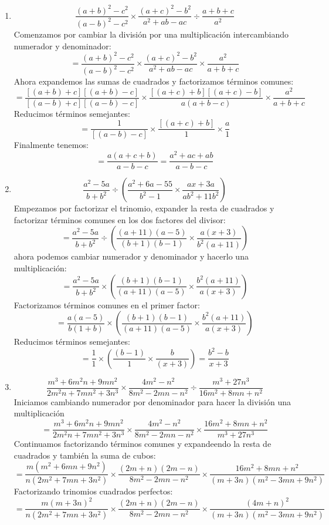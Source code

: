 \documentclass[12pt]{article}
\begin{document}
\begin{enumerate}[label=\bfseries Ejercicio \arabic*:]
  \item $$\frac{(a + b)^2 - c^2}{(a - b)^2 - c^2} \times \frac{(a + c)^2 -b^2}{a^2 + ab -ac} \div \frac{a + b+ c}{a^2}$$
Comenzamos por cambiar la división por una multiplicación intercambiando numerador y denominador:
$$= \frac{(a + b)^2 - c^2}{(a - b)^2 - c^2} \times \frac{(a + c)^2 -b^2}{a^2 + ab -ac} \times \frac{a^2}{a + b+ c}$$
Ahora expandemos las sumas de cuadrados y factorizamos términos comunes:
$$= \frac{[(a+ b) + c][(a+ b) - c]}{[(a - b) + c][(a - b) - c]} \times \frac{[(a + c) + b][(a + c) - b]}{a(a + b - c)} \times \frac{a^2}{a + b+ c}$$
Reducimos términos semejantes:
$$= \frac{1}{[(a - b) - c]} \times \frac{[(a + c) + b]}{1} \times \frac{a}{1}$$
Finalmente tenemos:
$$= \frac{a(a + c + b)}{a - b - c} = \frac{a^2 + ac + ab}{a - b - c}$$
  \item  $$\frac{a^2 - 5a}{b + b^2} \div \left( \frac{a^2 + 6a - 55}{b^2 - 1} \times \frac{ax + 3a}{ab^2 + 11b^2} \right)$$
Empezamos por factorizar el trinomio, expander la resta de cuadrados y factorizar términos comunes en los dos factores del divisor:
$$= \frac{a^2 - 5a}{b + b^2} \div \left( \frac{(a + 11)(a - 5)}{(b+1)(b - 1)} \times \frac{a(x + 3)}{b^2(a + 11)} \right)$$
ahora podemos cambiar numerador y denominador y hacerlo una multiplicación:
$$= \frac{a^2 - 5a}{b + b^2} \times \left( \frac{(b+1)(b - 1)}{(a + 11)(a - 5)} \times \frac{b^2(a + 11)}{a(x + 3)} \right)$$
Factorizamos términos comunes en el primer factor:
$$= \frac{a(a - 5)}{b(1 + b)} \times \left( \frac{(b+1)(b - 1)}{(a + 11)(a - 5)} \times \frac{b^2(a + 11)}{a(x + 3)} \right)$$
Reducimos términos semejantes:
$$= \frac{1}{1} \times \left( \frac{(b - 1)}{1} \times \frac{b}{(x + 3)} \right) = \frac{b^2 - b}{x + 3}$$
  \item $$\frac{m^3 + 6m^2n + 9mn^2}{2m^2n + 7 mn^2 + 3n^3} \times \frac{4m^2 - n^2}{8m^2 - 2mn -n^2} \div \frac{m^3 + 27n^3}{16m^2 + 8mn +n^2}$$
Iniciamos cambiando numerador por denominador para hacer la división una multiplicación
$$= \frac{m^3 + 6m^2n + 9mn^2}{2m^2n + 7 mn^2 + 3n^3} \times \frac{4m^2 - n^2}{8m^2 - 2mn -n^2} \times \frac{16m^2 + 8mn +n^2}{m^3 + 27n^3}$$
Continuamos factorizando términos comunes y expandeendo la resta de cuadrados y también la suma de cubos:
$$= \frac{m(m^2 + 6mn + 9n^2)}{n(2m^2 + 7 mn + 3n^2)} \times \frac{(2m + n)(2m - n)}{8m^2 - 2mn -n^2} \times \frac{16m^2 + 8mn +n^2}{(m + 3n)(m^2 - 3mn + 9n^2)}$$
Factorizando trinomios cuadrados perfectos:
$$= \frac{m(m + 3n)^2}{n(2m^2 + 7mn + 3n^2)} \times \frac{(2m + n)(2m - n)}{8m^2 - 2mn - n^2} \times \frac{(4m + n)^2}{(m + 3n)(m^2 - 3mn + 9n^2)}$$

\end{enumerate}
\end{document}
